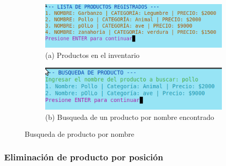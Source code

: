\documentclass[12pt]{article}
\begin{document}
\begin{figure}[H]
    \centering

    \begin{subfigure}[b]{0.6\textwidth}
        \centering
        \includegraphics[width=\textwidth]{Imagenes/productos_pre_busqueda.png}
        \caption*{(a) Productos en el inventario}
    \end{subfigure}
    \hfill
    \begin{subfigure}[b]{0.6\textwidth}
        \centering
        \includegraphics[width=\textwidth]{Imagenes/productos_post_busqueda.png}
        \caption*{(b) Busqueda de un producto por nombre encontrado}
    \end{subfigure}

    \caption{Busqueda de producto por  nombre}
    \label{fig:busqueda de producto}
\end{figure}

\subsubsection{Eliminación de producto por posición}
\end{document}
